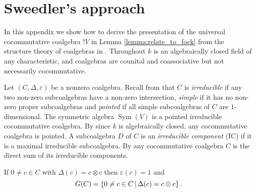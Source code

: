 \documentclass[english,letter paper,12pt,reqno]{article}
\theoremstyle{example}
\numberwithin{equation}{section}
\DeclareMathOperator{\Sym}{Sym}
\begin{document}
\section{Sweedler's approach}\label{section:compare_sweedler}

In this appendix we show how to derive the presentation of the universal cocommutative coalgebra ${!} V$ in Lemma \ref{lemma:relate_to_fock} from the structure theory of coalgebras in \cite{sweedler}. Throughout $k$ is an algebraically closed field of any characteristic, and coalgebras are counital and coassociative but not necessarily cocommutative.

Let $(C, \Delta, \varepsilon)$ be a nonzero coalgebra. Recall from \cite[Chapter 8]{sweedler} that $C$ is \emph{irreducible} if any two non-zero subcoalgebras have a non-zero intersection, \emph{simple} if it has no non-zero proper subcoalgebras and \emph{pointed} if all simple subcoalgebras of $C$ are $1$-dimensional. The symmetric algebra $\Sym(V)$ is a pointed irreducible cocommutative coalgebra. By \cite[Lemma 8.0.1]{sweedler} since $k$ is algebraically closed, any cocommutative coalgebra is pointed. A subcoalgebra $D$ of $C$ is an \emph{irreducible component} (IC) if it is a maximal irreducible subcoalgebra. By \cite[Theorem 8.0.5]{sweedler} any cocommutative coalgebra $C$ is the direct sum of its irreducible components.

If $0 \neq c \in C$ with $\Delta(c) = c \otimes c$ then $\varepsilon(c) = 1$ and
\[
G(C) = \{ 0 \neq c \in C \,|\, \Delta(c) = c \otimes c \}\,.
\]
\end{document}
